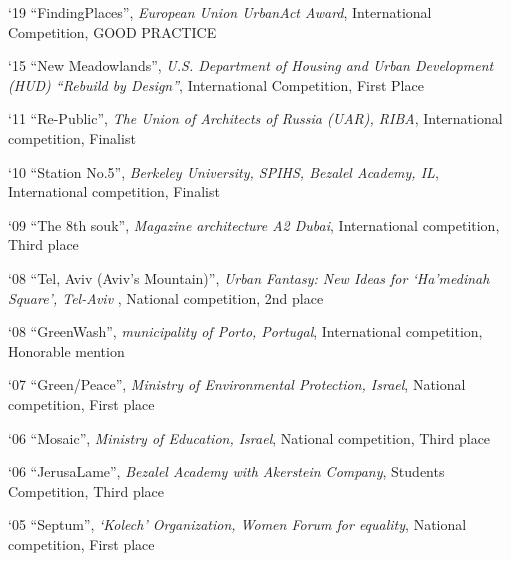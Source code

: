 \begin{tablist}
	     
	\item[`19]\tab \enquote{FindingPlaces},
	\textit{European Union UrbanAct Award},
	International Competition,
	GOOD PRACTICE
	
	
	\item[`15]\tab \enquote{New Meadowlands},
	\textit{U.S. Department of Housing and Urban Development (HUD) “Rebuild by Design”},
	International Competition,
	First Place 
	
	
	\item[`11]\tab \enquote{Re-Public},
	\textit{The Union of Architects of Russia (UAR), RIBA},
	International competition,
	Finalist
	
	
	\item[`10]\tab \enquote{Station No.5},
	\textit{Berkeley University, SPIHS, Bezalel Academy, IL},
	International competition,
	Finalist
	
	
	\item[`09]\tab \enquote{The 8th souk},
	\textit{Magazine architecture A2 Dubai},
	International competition,
	Third place
	
	
	\item[`08]\tab \enquote{Tel, Aviv (Aviv’s Mountain)},
	\textit{Urban Fantasy: New Ideas for ‘Ha’medinah Square’, Tel-Aviv },
	National competition,
	2nd place 
	
	
	\item[`08]\tab \enquote{GreenWash},
	\textit{municipality of Porto, Portugal},
	International competition,
	Honorable mention
	
	
	\item[`07]\tab \enquote{Green/Peace},
	\textit{Ministry of Environmental Protection, Israel},
	National competition,
	First place
	
	
	\item[`06]\tab \enquote{Mosaic},
	\textit{Ministry of Education, Israel},
	National competition,
	Third place
	
	
	\item[`06]\tab \enquote{JerusaLame},
	\textit{Bezalel Academy with Akerstein Company},
	Students Competition,
	Third place
	
	
	\item[`05]\tab \enquote{Septum},
	\textit{‘Kolech’ Organization, Women Forum for equality},
	National competition,
	First place
	
	
\end{tablist}


